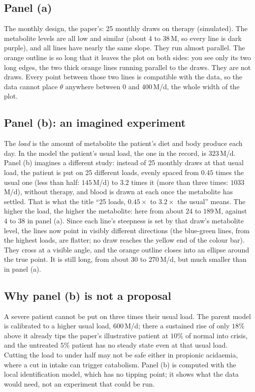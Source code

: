 \documentclass[11pt,a4paper]{article}
\newcommand{\um}{\,\textmu M/d}
\begin{document}
\subsection{Panel (a)} The monthly design, the paper's: 25 monthly draws on therapy (simulated). The metabolite
levels are all low and similar (about $4$ to $38$\,\textmu M, so every line is dark purple), and
all lines have nearly the same slope. They run almost parallel. The orange outline is so long
that it leaves the plot on both sides: you see only its two long edges, the two thick orange
lines running parallel to the draws. They are not draws. Every point between those two lines is
compatible with the data, so the data cannot place $\theta$ anywhere between $0$ and $400$\um,
the whole width of the plot.

\subsection{Panel (b): an imagined experiment} The \emph{load} is the amount of metabolite the
patient's diet and body produce each day. In the model the patient's usual load, the one in the
record, is $323$\um. Panel (b) imagines a different study: instead of 25 monthly draws at that
usual load, the patient is put on 25 different loads, evenly spaced from $0.45$ times the usual
one (less than half: $145$\um) to $3.2$ times it (more than three times: $1033$\um), without
therapy, and blood is drawn at each once the metabolite has settled. That is what the title
``25 loads, $0.45\times$ to $3.2\times$ the usual'' means. The higher the load, the higher the
metabolite: here from about $24$ to $189$\,\textmu M, against $4$ to $38$ in panel (a). Since each
line's steepness is set by that draw's metabolite level, the lines now point in visibly different
directions (the blue-green lines, from the highest loads, are flatter; no draw reaches the yellow
end of the colour bar). They cross at a visible angle, and the orange outline closes into an
ellipse around the true point. It is still long, from about $30$ to $270$\um, but much smaller
than in panel (a).

\subsection{Why panel (b) is not a proposal} A severe patient cannot be put on three times their
usual load. The parent model is calibrated to a higher usual load, $600$\um; there a sustained
rise of only $18\%$ above it already tips the paper's illustrative patient at $10\%$ of normal into
crisis, and the untreated $5\%$ patient has no steady state even at that usual load. Cutting the
load to under half may not be safe either in
propionic acidaemia, where a cut in intake can trigger catabolism. Panel (b) is computed with the
local identification model, which has no tipping point; it shows what the data would need, not
an experiment that could be run.
\end{document}
